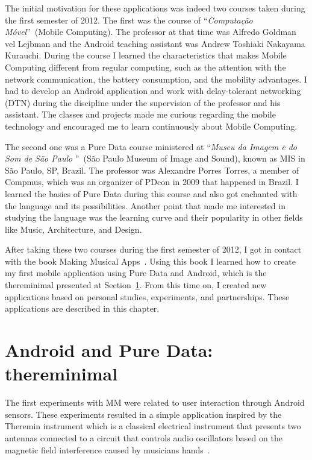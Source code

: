 The initial motivation for these applications was indeed two courses taken during the first semester of 2012.
The first was the course of ``\textit{Computação Móvel}''~(Mobile Computing).
The professor at that time was Alfredo Goldman vel Lejbman and the Android teaching assistant was Andrew Toshiaki Nakayama Kurauchi.
During the course I learned the characteristics that makes Mobile Computing different from regular computing, such as the attention with the network communication, the battery consumption, and the mobility advantages.
I had to develop an Android application and work with delay-tolerant networking (DTN) during the discipline under the supervision of the professor and his assistant.
The classes and projects made me curious regarding the mobile technology and encouraged me to learn continuously about Mobile Computing.

The second one was a Pure Data course ministered at ``\textit{Museu da Imagem e do Som de São Paulo} ''~(São Paulo Museum of Image and Sound), known as MIS in São Paulo, SP, Brazil.
The professor was Alexandre Porres Torres, a member of Compmus, which was an organizer of PDcon in 2009 that happened in Brazil.
I learned the basics of Pure Data during this course and also got enchanted with the language and its possibilities.
Another point that made me interested in studying the language was the learning curve and their popularity in other fields like Music, Architecture, and Design.

After taking these two courses during the first semester of 2012, I got in contact with the book Making Musical Apps~\citep{Brinkmann2012makingmusicalapps}.
Using this book I learned how to create my first mobile application using Pure Data and Android, which is the thereminimal presented at Section~\ref{apesec:appthereminimal}.
From this time on, I created new applications  based on personal studies, experiments, and partnerships.
These applications are described in this chapter.


\section{Android and Pure Data: thereminimal}
\label{apesec:appthereminimal}

The first experiments with MM were related to user interaction through Android sensors.
These experiments resulted in a simple application inspired by the Theremin instrument which is a classical electrical instrument that presents two antennas connected to a circuit that controls audio oscillators based on the magnetic field interference caused by musicians hands~\citep{Glinsky1992Theremin}.


